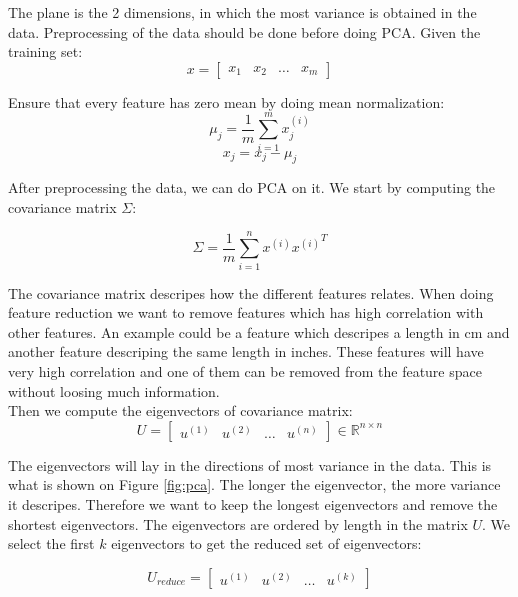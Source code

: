 The plane is the 2 dimensions, in which the most variance is obtained in the data. Preprocessing of the data should be done before doing PCA. Given the training set:
\begin{equation}
x = 
\begin{bmatrix}
x_1 & x_2 & \dots & x_m
\end{bmatrix}
\end{equation}

Ensure that every feature has zero mean by doing mean normalization:
\begin{equation}
\mu_j = \frac{1}{m} \sum^m_{i=1} x_j^{(i)}
\end{equation}
\begin{equation}
x_j = x_j - \mu_j
\end{equation}

After preprocessing the data, we can do PCA on it. We start by computing the covariance matrix $\Sigma$:

\begin{equation}
\Sigma = \frac{1}{m} \sum^n_{i=1} x^{(i)} {x^{(i)}}^T
\end{equation}

The covariance matrix descripes how the different features relates. When doing feature reduction we want to remove features which has high correlation with other features.
An example could be a feature which descripes a length in cm and another feature descriping the same length in inches.
These features will have very high correlation and one of them can be removed from the feature space without loosing much information. \\

Then we compute the eigenvectors of covariance matrix:
\begin{equation}
U = \begin{bmatrix}
   u^{(1)} & u^{(2)} & \dots & u^{(n)}
 \end{bmatrix}
\in \mathbb{R}^{n \times n}
\end{equation}

The eigenvectors will lay in the directions of most variance in the data. This is what is shown on Figure \ref{fig:pca}.
The longer the eigenvector, the more variance it descripes.
Therefore we want to keep the longest eigenvectors and remove the shortest eigenvectors. The eigenvectors are ordered by length in the matrix $U$.  We select the first $k$ eigenvectors to get the reduced set of eigenvectors:

\begin{equation}
U_{reduce} = \begin{bmatrix}
   u^{(1)} & u^{(2)} & \dots & u^{(k)}
 \end{bmatrix}
\end{equation}

